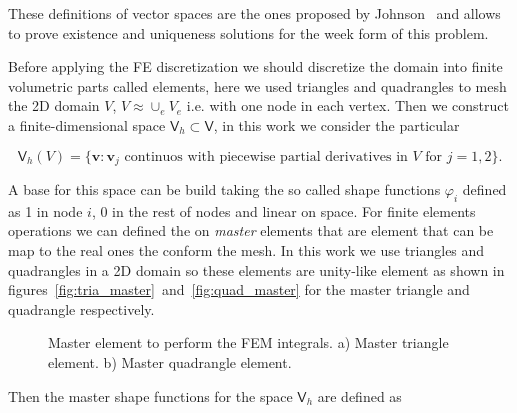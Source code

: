\documentclass[review]{elsarticle}
\begin{document}
These definitions of vector spaces are the ones proposed by
Johnson~\cite{johnson-first} and allows to prove existence and uniqueness
solutions for the week form of this problem.

Before applying the FE discretization we should discretize the domain into finite
volumetric parts called elements, here we used triangles and quadrangles to mesh
the 2D domain $V$, $V \approx \cup_e V_e$ i.e. with one node in each vertex.
Then we construct a finite-dimensional space 
$\bm{\mathsf{V}}_h \subset \bm{\mathsf{V}}$, in this work we consider the
particular

\begin{equation}
\bm{\mathsf{V}}_h(V) = \{ 
  \bm{v} : \bm{v}_j \text{ continuos with piecewise partial derivatives in } V
  \text{ for } j=1,2
\}.
\end{equation}

A base for this space can be build taking the so called shape functions
$\varphi_i$ defined as 1 in node $i$, 0 in the rest of nodes and linear on
space. For finite elements operations we can defined the on \emph{master}
elements that are element that can be map to the real ones the conform the mesh.
In this work we use triangles and quadrangles in a 2D domain so these elements
are unity-like element as shown in
figures~\ref{fig:tria_master}~and~\ref{fig:quad_master} for the master triangle
and quadrangle respectively.


\begin{figure}[!ht]
\begin{minipage}[b]{0.4\linewidth}
\subcaptionbox{\label{fig:tria_master}}{
\resizebox{4.0cm}{!}{}}
\end{minipage}
\hspace{1.5cm}
\begin{minipage}[b]{0.4\linewidth}
\subcaptionbox{\label{fig:quad_master}}{
\resizebox{4.0cm}{!}{}}
\end{minipage}
\caption{Master element to perform the FEM integrals.
a) Master triangle element. 
b) Master quadrangle element.
}
\label{fig_dist_scheme}
\end{figure}


Then the master shape functions for the space $\bm{\mathsf{V}}_h$ are defined as
\end{document}

